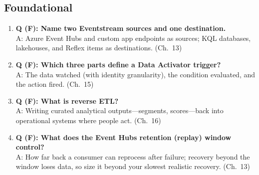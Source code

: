 \subsection*{Foundational}
\begin{enumerate}
    \item \textbf{Q (F): Name two Eventstream sources and one destination.}\\
    A: Azure Event Hubs and custom app endpoints as sources; KQL databases, lakehouses, and
    Reflex items as destinations. (Ch.~13)
    \item \textbf{Q (F): Which three parts define a Data Activator trigger?}\\
    A: The data watched (with identity granularity), the condition evaluated, and the action
    fired. (Ch.~15)
    \item \textbf{Q (F): What is reverse ETL?}\\
    A: Writing curated analytical outputs---segments, scores---back into operational systems
    where people act. (Ch.~16)
    \item \textbf{Q (F): What does the Event Hubs retention (replay) window control?}\\
    A: How far back a consumer can reprocess after failure; recovery beyond the window loses
    data, so size it beyond your slowest realistic recovery. (Ch.~13)
\end{enumerate}

